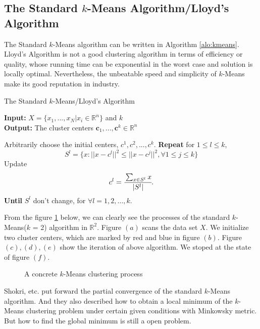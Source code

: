 	\subsection{The Standard $k$-Means Algorithm/Lloyd's Algorithm}
	The Standard $k$-Means algorithm can be written in Algorithm \ref{alo:kmeans}. Lloyd's Algorithm is not a good clustering algorithm in terms of efficiency or quality, whose running time can be exponential in the worst case and solution is locally optimal. Nevertheless, the unbeatable speed and simplicity of $k$-Means make its good reputation in industry.
	
	
	\begin{algorithm}
		\caption{The Standard $k$-Means/Lloyd's Algorithm}
		\label{alo:kmeans}
		\textbf{Input:}  $X=\lbrace x_{1},...,x_{N}| x_{i}\in\mathbb{R}^n\rbrace$ and $k$\\
		\textbf{Output:} The cluster centers $\mathbf c_1,...,\mathbf c^{k}\in\mathbb{R}^n$\\
		\begin{algorithmic}[1]
			\State Arbitrarily choose the initial centers, $c^{1},c^{2},...,c^{k}$.
			\State \textbf{Repeat} for $1\leq l \leq k$,
				$$
				S^{l} = \{x: ||x-c^{l}||^{2} \leq ||x-c^{j}||^{2}, \forall 1\leq j \leq k\}
				$$
				Update
				$$
				c^{l}=\cfrac{\sum_{x\in S^{l}}x}{|S^{l}|}.
				$$
			\textbf{Until} $S^{l}$ don't change, for $\forall l=1,2,\dots,k$.

		\end{algorithmic}
	\end{algorithm}


	From the figure \ref{alo:kmeans basic} below, we can clearly see the processes of the standard $k$-Means($k$ = 2) algorithm in $\mathbb{R}^{2}$. Figure $(a)$ scans the data set $X$. We initialize two cluster centers, which are marked by red and blue in figure $(b)$. Figure $(c), (d), (e)$ show the iteration of above algorithm. We stoped at the state of figure $(f)$.

	\begin{figure}[htbp]
	\caption{A concrete $k$-Means clustering process}
	\label{alo:kmeans basic}
\end{figure}

         Shokri, etc. put forward the partial convergence of  the standard $k$-Means algorithm. And they also described how to obtain a local minimum of the $k$-Means clustering problem under certain given conditions with Minkowsky metric. But how to find the global minimum is still a open problem.

